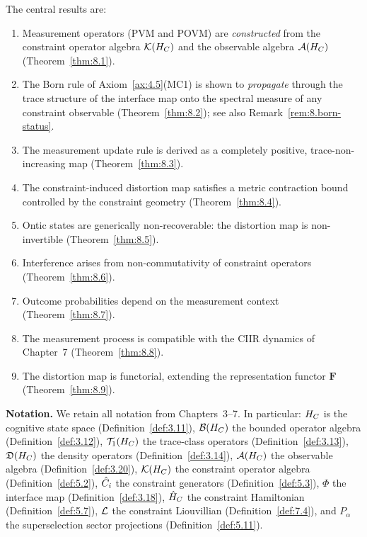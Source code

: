 The central results are:
\begin{enumerate}
  \item Measurement operators (PVM and POVM) are \emph{constructed}
    from the constraint operator algebra $\mathcal{K}(H_C)$ and the observable
    algebra $\mathcal{A}(H_C)$ (Theorem~\ref{thm:8.1}).
  \item The Born rule of Axiom~\ref{ax:4.5}(MC1) is shown to
    \emph{propagate} through the trace structure of the interface
    map onto the spectral measure of any constraint observable
    (Theorem~\ref{thm:8.2}); see also Remark~\ref{rem:8.born-status}.
  \item The measurement update rule is derived as a completely positive,
    trace-non-increasing map (Theorem~\ref{thm:8.3}).
  \item The constraint-induced distortion map satisfies a metric
    contraction bound controlled by the constraint geometry
    (Theorem~\ref{thm:8.4}).
  \item Ontic states are generically non-recoverable: the distortion
    map is non-invertible (Theorem~\ref{thm:8.5}).
  \item Interference arises from non-commutativity of constraint
    operators (Theorem~\ref{thm:8.6}).
  \item Outcome probabilities depend on the measurement context
    (Theorem~\ref{thm:8.7}).
  \item The measurement process is compatible with the CIIR dynamics of
    Chapter~7 (Theorem~\ref{thm:8.8}).
  \item The distortion map is functorial, extending the representation
    functor $\mathbf{F}$ (Theorem~\ref{thm:8.9}).
\end{enumerate}

\medskip
\noindent\textbf{Notation.}  We retain all notation from Chapters~3--7.
In particular: $H_C$ is the cognitive state space
(Definition~\ref{def:3.11}), $\mathcal{B}(H_C)$ the bounded operator algebra
(Definition~\ref{def:3.12}), $\mathcal{T}_1(H_C)$ the trace-class
operators (Definition~\ref{def:3.13}), $\mathfrak{D}(H_C)$ the density
operators (Definition~\ref{def:3.14}), $\mathcal{A}(H_C)$ the observable
algebra (Definition~\ref{def:3.20}), $\mathcal{K}(H_C)$ the constraint
operator algebra (Definition~\ref{def:5.2}), $\hat{C}_i$ the constraint
generators (Definition~\ref{def:5.3}), $\Phi$ the interface map
(Definition~\ref{def:3.18}), $\hat{H}_C$ the constraint Hamiltonian
(Definition~\ref{def:5.7}), $\mathcal{L}$ the constraint Liouvillian
(Definition~\ref{def:7.4}), and $P_\alpha$ the superselection sector
projections (Definition~\ref{def:5.11}).

